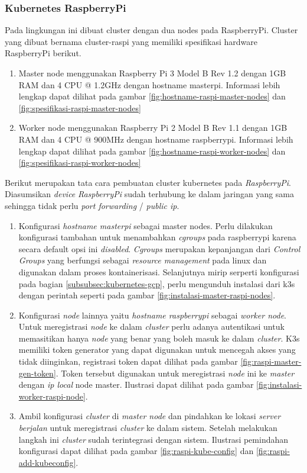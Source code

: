 \subsubsection{Kubernetes RaspberryPi}
Pada lingkungan ini dibuat cluster dengan dua nodes pada RaspberryPi. Cluster yang dibuat bernama cluster-raspi yang memiliki spesifikasi hardware RaspberryPi berikut.

\begin{enumerate}
  \item Master node menggunakan Raspberry Pi 3 Model B Rev 1.2 dengan 1GB RAM dan 4 CPU @ 1.2GHz dengan hostname masterpi. Informasi lebih lengkap dapat dilihat pada gambar \ref{fig:hostname-raspi-master-nodes} dan \ref{fig:spesifikasi-raspi-master-nodes}
  \item Worker node menggunakan Raspberry Pi 2 Model B Rev 1.1 dengan 1GB RAM dan 4 CPU @ 900MHz dengan hostname raspberrypi. Informasi lebih lengkap dapat dilihat pada gambar \ref{fig:hostname-raspi-worker-nodes} dan \ref{fig:spesifikasi-raspi-worker-nodes}
\end{enumerate}

Berikut merupakan tata cara pembuatan cluster kubernetes pada \textit{RaspberryPi}. Diasumsikan \textit{device} \textit{RaspberryPi} sudah terhubung ke dalam jaringan yang sama sehingga tidak perlu \textit{port forwarding} / \textit{public ip}.

\begin{enumerate}
  \item Konfigurasi \textit{hostname masterpi} sebagai master nodes. Perlu dilakukan konfigurasi tambahan untuk menambahkan \textit{cgroups} pada raspberrypi karena secara default opsi ini \textit{disabled}. \textit{Cgroups} merupakan kepanjangan dari \textit{Control Groups} yang berfungsi sebagai \textit{resource management} pada linux dan digunakan dalam proses kontainerisasi. Selanjutnya mirip serperti konfigurasi pada bagian \ref{subsubsec:kubernetes-gcp}, perlu mengunduh instalasi dari k3s dengan perintah seperti pada gambar \ref{fig:instalasi-master-raspi-nodes}.
  \item Konfigurasi \textit{node} lainnya yaitu \textit{hostname raspberrypi} sebagai \textit{worker node}. Untuk meregistrasi \textit{node} ke dalam \textit{cluster} perlu adanya autentikasi untuk memasitikan hanya \textit{node} yang benar yang boleh masuk ke dalam \textit{cluster}. K3s memiliki token generator yang dapat digunakan untuk mencegah akses yang tidak diinginkan, registrasi token dapat dilihat pada gambar \ref{fig:raspi-master-gen-token}. Token tersebut digunakan untuk meregistrasi \textit{node} ini ke \textit{master} dengan \textit{ip local} node master. Ilustrasi dapat dilihat pada gambar \ref{fig:instalasi-worker-raspi-node}.
  \item Ambil konfigurasi \textit{cluster} di \textit{master node} dan pindahkan ke lokasi \textit{server berjalan} untuk meregistrasi \textit{cluster} ke dalam sistem. Setelah melakukan langkah ini \textit{cluster} sudah terintegrasi dengan sistem. Ilustrasi pemindahan konfigurasi dapat dilihat pada gambar \ref{fig:raspi-kube-config} dan \ref{fig:raspi-add-kubeconfig}.
\end{enumerate}